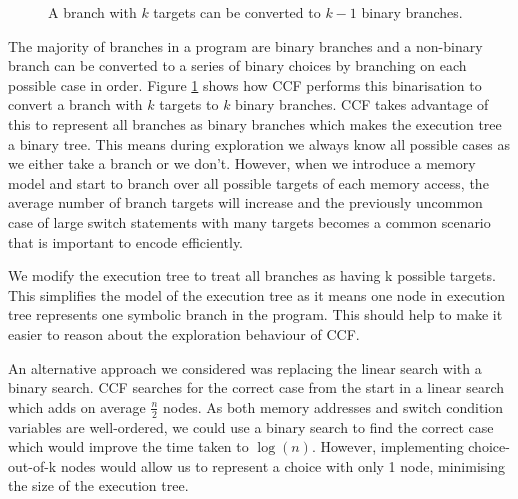 \documentclass[12pt,twoside]{report}
\begin{document}
\begin{figure}
    \centering
    \caption{A branch with $k$ targets can be converted to $k - 1$ binary branches.}
    \label{fig:binarising}
\end{figure}
The majority of branches in a program are binary branches and a non-binary branch can be converted to a series of binary choices by branching on each possible case in order. Figure \ref{fig:binarising} shows how CCF performs this binarisation to convert a branch with $k$ targets to $k$ binary branches. CCF takes advantage of this to represent all branches as binary branches which makes the execution tree a binary tree. This means during exploration we always know all possible cases as we either take a branch or we don't. However, when we introduce a memory model and start to branch over all possible targets of each memory access, the average number of branch targets will increase and the previously uncommon case of large switch statements with many targets becomes a common scenario that is important to encode efficiently.

We modify the execution tree to treat all branches as having k possible targets. This simplifies the model of the execution tree as it means one node in execution tree represents one symbolic branch in the program. This should help to make it easier to reason about the exploration behaviour of CCF.

An alternative approach we considered was replacing the linear search with a binary search. CCF searches for the correct case from the start in a linear search which adds on average $\frac{n}{2}$ nodes. As both memory addresses and switch condition variables are well-ordered, we could use a binary search to find the correct case which would improve the time taken to $\log(n)$. However, implementing choice-out-of-k nodes would allow us to represent a choice with only 1 node, minimising the size of the execution tree.
\end{document}
